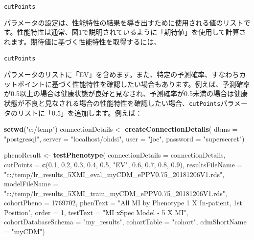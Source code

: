 \documentclass[
  11pt]{book}
\newenvironment{Shaded}{\begin{snugshade}}{\end{snugshade}}
\newcommand{\AttributeTok}[1]{\textcolor[rgb]{0.13,0.29,0.53}{#1}}
\newcommand{\DecValTok}[1]{\textcolor[rgb]{0.00,0.00,0.81}{#1}}
\newcommand{\FloatTok}[1]{\textcolor[rgb]{0.00,0.00,0.81}{#1}}
\newcommand{\FunctionTok}[1]{\textcolor[rgb]{0.13,0.29,0.53}{\textbf{#1}}}
\newcommand{\NormalTok}[1]{#1}
\newcommand{\OtherTok}[1]{\textcolor[rgb]{0.56,0.35,0.01}{#1}}
\newcommand{\StringTok}[1]{\textcolor[rgb]{0.31,0.60,0.02}{#1}}
\theoremstyle{definition}
\theoremstyle{definition}
\theoremstyle{definition}
\theoremstyle{definition}
\theoremstyle{remark}
\begin{document}
\texttt{cutPoints}

パラメータの設定は、性能特性の結果を導き出すために使用される値のリストです。性能特性は通常、図1で説明されているように「期待値」を使用して計算されます。期待値に基づく性能特性を取得するには、

\texttt{cutPoints}

パラメータのリストに「EV」を含めます。また、特定の予測確率、すなわちカットポイントに基づく性能特性を確認したい場合もあります。例えば、予測確率が0.5以上の場合は健康状態が良好と見なされ、予測確率が0.5未満の場合は健康状態が不良と見なされる場合の性能特性を確認したい場合、\texttt{cutPoints}パラメータのリストに「0.5」を追加します。例えば：

\begin{Shaded}
\begin{Highlighting}[]
\FunctionTok{setwd}\NormalTok{(}\StringTok{"c:/temp"}\NormalTok{)}
\NormalTok{connectionDetails }\OtherTok{\textless{}{-}} \FunctionTok{createConnectionDetails}\NormalTok{(}
  \AttributeTok{dbms =} \StringTok{"postgresql"}\NormalTok{,}
  \AttributeTok{server =} \StringTok{"localhost/ohdsi"}\NormalTok{,}
  \AttributeTok{user =} \StringTok{"joe"}\NormalTok{,}
  \AttributeTok{password =} \StringTok{"supersecret"}\NormalTok{)}

\NormalTok{phenoResult }\OtherTok{\textless{}{-}} \FunctionTok{testPhenotype}\NormalTok{(}
  \AttributeTok{connectionDetails =}\NormalTok{ connectionDetails,}
  \AttributeTok{cutPoints =} \FunctionTok{c}\NormalTok{(}\FloatTok{0.1}\NormalTok{, }\FloatTok{0.2}\NormalTok{, }\FloatTok{0.3}\NormalTok{, }\FloatTok{0.4}\NormalTok{, }\FloatTok{0.5}\NormalTok{, }\StringTok{"EV"}\NormalTok{, }\FloatTok{0.6}\NormalTok{, }\FloatTok{0.7}\NormalTok{, }\FloatTok{0.8}\NormalTok{, }\FloatTok{0.9}\NormalTok{),}
  \AttributeTok{resultsFileName =}
    \StringTok{"c:/temp/lr\_results\_5XMI\_eval\_myCDM\_ePPV0.75\_20181206V1.rds"}\NormalTok{,}
  \AttributeTok{modelFileName =}
    \StringTok{"c:/temp/lr\_results\_5XMI\_train\_myCDM\_ePPV0.75\_20181206V1.rds"}\NormalTok{,}
  \AttributeTok{cohortPheno =} \DecValTok{1769702}\NormalTok{,}
  \AttributeTok{phenText =} \StringTok{"All MI by Phenotype 1 X In{-}patient, 1st Position"}\NormalTok{,}
  \AttributeTok{order =} \DecValTok{1}\NormalTok{,}
  \AttributeTok{testText =} \StringTok{"MI xSpec Model {-} 5 X MI"}\NormalTok{,}
  \AttributeTok{cohortDatabaseSchema =} \StringTok{"my\_results"}\NormalTok{,}
  \AttributeTok{cohortTable =} \StringTok{"cohort"}\NormalTok{,}
  \AttributeTok{cdmShortName =} \StringTok{"myCDM"}\NormalTok{)}
\end{Highlighting}
\end{Shaded}
\end{document}
